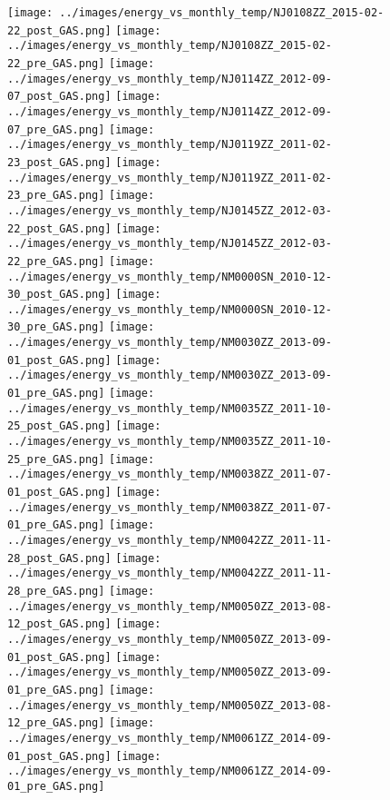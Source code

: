 \clearpage
\begin{figure}
\centering
\texttt{[image: ../images/energy\_vs\_monthly\_temp/NJ0108ZZ\_2015-02-22\_post\_GAS.png]}
\texttt{[image: ../images/energy\_vs\_monthly\_temp/NJ0108ZZ\_2015-02-22\_pre\_GAS.png]}
\texttt{[image: ../images/energy\_vs\_monthly\_temp/NJ0114ZZ\_2012-09-07\_post\_GAS.png]}
\texttt{[image: ../images/energy\_vs\_monthly\_temp/NJ0114ZZ\_2012-09-07\_pre\_GAS.png]}
\texttt{[image: ../images/energy\_vs\_monthly\_temp/NJ0119ZZ\_2011-02-23\_post\_GAS.png]}
\texttt{[image: ../images/energy\_vs\_monthly\_temp/NJ0119ZZ\_2011-02-23\_pre\_GAS.png]}
\texttt{[image: ../images/energy\_vs\_monthly\_temp/NJ0145ZZ\_2012-03-22\_post\_GAS.png]}
\texttt{[image: ../images/energy\_vs\_monthly\_temp/NJ0145ZZ\_2012-03-22\_pre\_GAS.png]}
\texttt{[image: ../images/energy\_vs\_monthly\_temp/NM0000SN\_2010-12-30\_post\_GAS.png]}
\texttt{[image: ../images/energy\_vs\_monthly\_temp/NM0000SN\_2010-12-30\_pre\_GAS.png]}
\texttt{[image: ../images/energy\_vs\_monthly\_temp/NM0030ZZ\_2013-09-01\_post\_GAS.png]}
\texttt{[image: ../images/energy\_vs\_monthly\_temp/NM0030ZZ\_2013-09-01\_pre\_GAS.png]}
\texttt{[image: ../images/energy\_vs\_monthly\_temp/NM0035ZZ\_2011-10-25\_post\_GAS.png]}
\texttt{[image: ../images/energy\_vs\_monthly\_temp/NM0035ZZ\_2011-10-25\_pre\_GAS.png]}
\texttt{[image: ../images/energy\_vs\_monthly\_temp/NM0038ZZ\_2011-07-01\_post\_GAS.png]}
\texttt{[image: ../images/energy\_vs\_monthly\_temp/NM0038ZZ\_2011-07-01\_pre\_GAS.png]}
\texttt{[image: ../images/energy\_vs\_monthly\_temp/NM0042ZZ\_2011-11-28\_post\_GAS.png]}
\texttt{[image: ../images/energy\_vs\_monthly\_temp/NM0042ZZ\_2011-11-28\_pre\_GAS.png]}
\texttt{[image: ../images/energy\_vs\_monthly\_temp/NM0050ZZ\_2013-08-12\_post\_GAS.png]}
\texttt{[image: ../images/energy\_vs\_monthly\_temp/NM0050ZZ\_2013-09-01\_post\_GAS.png]}
\texttt{[image: ../images/energy\_vs\_monthly\_temp/NM0050ZZ\_2013-09-01\_pre\_GAS.png]}
\texttt{[image: ../images/energy\_vs\_monthly\_temp/NM0050ZZ\_2013-08-12\_pre\_GAS.png]}
\texttt{[image: ../images/energy\_vs\_monthly\_temp/NM0061ZZ\_2014-09-01\_post\_GAS.png]}
\texttt{[image: ../images/energy\_vs\_monthly\_temp/NM0061ZZ\_2014-09-01\_pre\_GAS.png]}
\end{figure}
